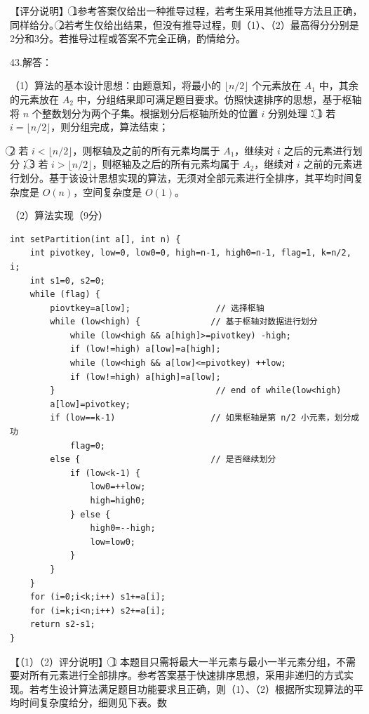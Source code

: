 \documentclass[UTF8,11pt]{ctexart}
\begin{document}
【评分说明】 \textcircled{1}参考答案仅给出一种推导过程，若考生采用其他推导方法且正确，同样给分。\textcircled{2}若考生仅给出结果，但没有推导过程，则（1）、（2）最高得分分别是2分和3分。若推导过程或答案不完全正确，酌情给分。


43.解答：


（1）算法的基本设计思想：由题意知，将最小的 \(\displaystyle \lfloor n/2\rfloor\) 个元素放在 \(\displaystyle A_1\) 中，其余的元素放在 \(\displaystyle A_2\) 中，分组结果即可满足题目要求。仿照快速排序的思想，基于枢轴将 \(\displaystyle n\) 个整数划分为两个子集。根据划分后枢轴所处的位置 \(\displaystyle i\) 分别处理：\textcircled{1} 若 \(\displaystyle i=\lfloor n/2\rfloor\)，则分组完成，算法结束；


\textcircled{2} 若 \(\displaystyle i<\lfloor n/2\rfloor\)，则枢轴及之前的所有元素均属于 \(\displaystyle A_1\)，继续对 \(\displaystyle i\) 之后的元素进行划分；\textcircled{3} 若 \(\displaystyle i>\lfloor n/2\rfloor\)，则枢轴及之后的所有元素均属于 \(\displaystyle A_2\)，继续对 \(\displaystyle i\) 之前的元素进行划分。基于该设计思想实现的算法，无须对全部元素进行全排序，其平均时间复杂度是 \(\displaystyle O(n)\)，空间复杂度是 \(\displaystyle O(1)\)。


（2）算法实现（9分）


\begin{Verbatim}[breaklines,breakanywhere,fontsize=\small]
int setPartition(int a[], int n) {
    int pivotkey, low=0, low0=0, high=n-1, high0=n-1, flag=1, k=n/2, i;
    int s1=0, s2=0;
    while (flag) {
        piovtkey=a[low];                 // 选择枢轴
        while (low<high) {              // 基于枢轴对数据进行划分
            while (low<high && a[high]>=pivotkey) -high;
            if (low!=high) a[low]=a[high];
            while (low<high && a[low]<=pivotkey) ++low;
            if (low!=high) a[high]=a[low];
        }                                // end of while(low<high)
        a[low]=pivotkey;
        if (low==k-1)                   // 如果枢轴是第 n/2 小元素，划分成功
            flag=0;
        else {                          // 是否继续划分
            if (low<k-1) {
                low0=++low;
                high=high0;
            } else {
                high0=--high;
                low=low0;
            }
        }
    }
    for (i=0;i<k;i++) s1+=a[i];
    for (i=k;i<n;i++) s2+=a[i];
    return s2-s1;
}

\end{Verbatim}

【（1）（2）评分说明】 \textcircled{1} 本题目只需将最大一半元素与最小一半元素分组，不需要对所有元素进行全部排序。参考答案基于快速排序思想，采用非递归的方式实现。若考生设计算法满足题目功能要求且正确，则（1）、（2）根据所实现算法的平均时间复杂度给分，细则见下表。数
\end{document}
